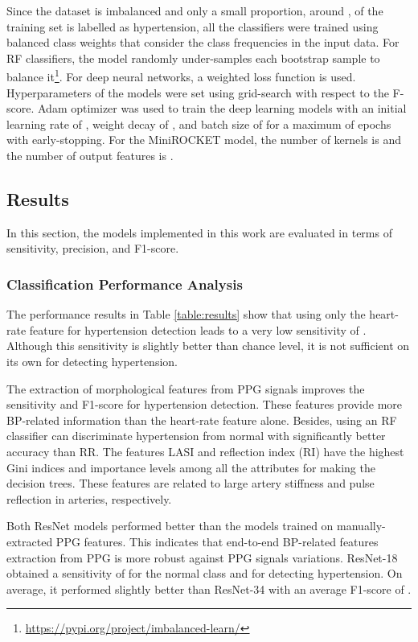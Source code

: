 \documentclass[letterpaper, 10 pt, conference]{ieeeconf}
\begin{document}
Since the dataset is imbalanced and only a small proportion, around , of the training set is labelled as hypertension, all the classifiers were trained using balanced class weights that consider the class frequencies in the input data. For RF classifiers, the model randomly under-samples each bootstrap sample to balance it\footnote{\url{https://pypi.org/project/imbalanced-learn/}}. For deep neural networks, a weighted loss function is used.
Hyperparameters of the models were set using grid-search with respect to the F-score. Adam optimizer was used to train the deep learning models with an initial learning rate of , weight decay of , and batch size of  for a maximum of  epochs with early-stopping. 
For the MiniROCKET model, the number of kernels is  and the number of output features is  .











\subsection{Results}
In this section, the models implemented in this work are evaluated in terms of sensitivity, precision, and F1-score.

\subsubsection{Classification Performance Analysis}
The performance results in Table \ref{table:results} show that using only the heart-rate feature for hypertension detection leads to a very low sensitivity of . Although this sensitivity is slightly better than chance level, it is not sufficient on its own for detecting hypertension.

The extraction of morphological features from PPG signals improves the sensitivity and F1-score for hypertension detection. These features provide more BP-related information than the heart-rate feature alone. Besides, using an RF classifier can discriminate hypertension from normal with significantly better accuracy than RR. The features LASI and reflection index (RI) have the highest Gini indices and importance levels among all the attributes for making the decision trees. These features are related to large artery stiffness and pulse reflection in arteries, respectively.


Both ResNet models performed better than the models trained on manually-extracted PPG features. This indicates that end-to-end BP-related features extraction from PPG is more robust against PPG signals variations. ResNet-18 obtained a sensitivity of  for the normal class and  for detecting hypertension. On average, it performed slightly better than ResNet-34 with an average F1-score of . 
\end{document}
